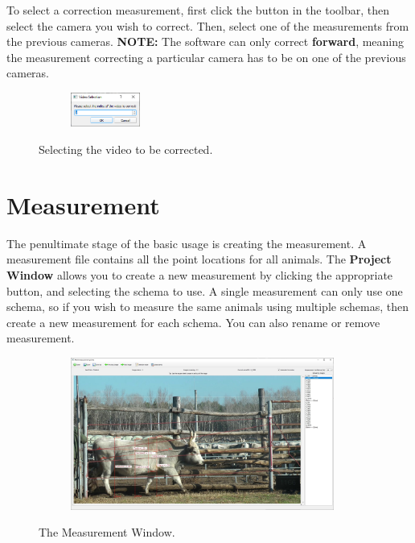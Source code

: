 \documentclass[10pt,a4paper,oneside]{report}             %
\begin{document}
To select a correction measurement, first click the button in the toolbar, then select the camera you wish to correct. Then, select one of the measurements from the previous cameras. \textbf{NOTE:} The software can only correct \textbf{forward}, meaning the measurement correcting a particular camera has to be on one of the previous cameras.

\begin{figure}[H]
	\centering
	\begin{subfigure}{\textwidth}
		\centering 
		\includegraphics[width=0.25\textwidth]{./images/SelectVideoCorr.png}
	\end{subfigure}
	\caption[]
	{\small  Selecting the video to be corrected.}
\end{figure} 

\section{Measurement}

The penultimate stage of the basic usage is creating the measurement. A measurement file contains all the point locations for all animals. The \textbf{Project Window} allows you to create a new measurement by clicking the appropriate button, and selecting the schema to use. A single measurement can only use one schema, so if you wish to measure the same animals using multiple schemas, then create a new measurement for each schema. You can also rename or remove measurement. 

\begin{figure}[H]
	\centering
	\begin{subfigure}{\textwidth}
		\centering 
		\includegraphics[width=0.95\textwidth]{./images/MeasW.jpg}
	\end{subfigure}
	\caption[]
	{\small  The Measurement Window.}
\end{figure} 
\end{document}
